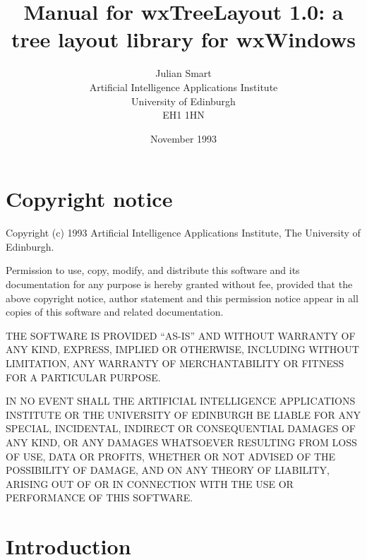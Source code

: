 %

\parskip=10pt%
\title{Manual for wxTreeLayout 1.0: a tree layout library for wxWindows}
\author{Julian Smart\\Artificial Intelligence Applications Institute\\
University of Edinburgh\\EH1 1HN}
\date{November 1993}%
\makeindex%
%
\maketitle

\pagestyle{fancyplain}

\setfooter{\thepage}{}{}{}{}{\thepage}
\tableofcontents%

\chapter*{Copyright notice}
%
\setfooter{\thepage}{}{}{}{}{\thepage}

Copyright (c) 1993 Artificial Intelligence Applications Institute,
The University of Edinburgh.

Permission to use, copy, modify, and distribute this software and its
documentation for any purpose is hereby granted without fee, provided that the
above copyright notice, author statement and this permission notice appear in
all copies of this software and related documentation.

THE SOFTWARE IS PROVIDED ``AS-IS'' AND WITHOUT WARRANTY OF ANY KIND, EXPRESS,
IMPLIED OR OTHERWISE, INCLUDING WITHOUT LIMITATION, ANY WARRANTY OF
MERCHANTABILITY OR FITNESS FOR A PARTICULAR PURPOSE.

IN NO EVENT SHALL THE ARTIFICIAL INTELLIGENCE APPLICATIONS INSTITUTE OR THE
UNIVERSITY OF EDINBURGH BE LIABLE FOR ANY SPECIAL, INCIDENTAL, INDIRECT OR
CONSEQUENTIAL DAMAGES OF ANY KIND, OR ANY DAMAGES WHATSOEVER RESULTING FROM
LOSS OF USE, DATA OR PROFITS, WHETHER OR NOT ADVISED OF THE POSSIBILITY OF
DAMAGE, AND ON ANY THEORY OF LIABILITY, ARISING OUT OF OR IN CONNECTION WITH
THE USE OR PERFORMANCE OF THIS SOFTWARE.

\chapter{Introduction}
%
%
\setfooter{\thepage}{}{}{}{}{\thepage}

